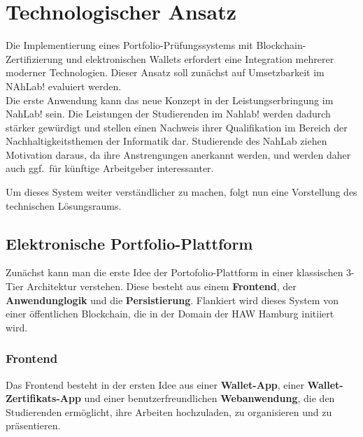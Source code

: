 \documentclass[conference]{IEEEtran}
\begin{document}
\section{Technologischer Ansatz}
Die Implementierung eines Portfolio-Prüfungssystems mit Blockchain-Zertifizierung und elektronischen Wallets erfordert eine Integration mehrerer moderner Technologien. Dieser Ansatz soll zunächst auf Umsetzbarkeit im NAhLab! evaluiert werden.\\ Die erste Anwendung kann das neue Konzept in der Leistungserbringung im NahLab! sein.
Die Leistungen der Studierenden im Nahlab! werden dadurch stärker gewürdigt und stellen einen Nachweis ihrer Qualifikation im Bereich der Nachhaltigkeitsthemen der Informatik dar. Studierende des NahLab ziehen Motivation daraus, da ihre Anstrengungen anerkannt werden, und werden daher auch ggf.~für künftige Arbeitgeber interessanter.

Um dieses System weiter verständlicher zu machen, folgt nun eine Vorstellung des  technischen Lösungsraums.

\subsection{Elektronische Portfolio-Plattform}
Zunächst kann man die erste Idee der Portofolio-Plattform in einer klassischen 3-Tier Architektur \cite{tanenbaum2017distributed} verstehen. Diese besteht aus einem \textbf{Frontend}, der \textbf{Anwendunglogik} und die \textbf{Persistierung}. Flankiert wird dieses System von einer öffentlichen Blockchain, die in der Domain der HAW Hamburg initiiert wird. 

\subsubsection{Frontend}
Das Frontend besteht in der ersten Idee aus einer \textbf{Wallet-App}, einer \textbf{Wallet-Zertifikats-App} und einer benutzerfreundlichen \textbf{Webanwendung}, die den Studierenden ermöglicht, ihre Arbeiten hochzuladen, zu organisieren und zu präsentieren. 
\end{document}
